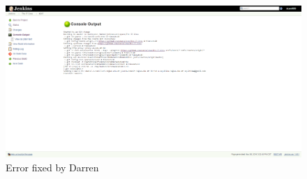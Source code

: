 \documentclass[UTF8]{article}
\begin{document}
\newpage
\begin{figure}[h]
  \includegraphics[width=\textwidth, height=\textheight,keepaspectratio]{BreakFix3Darren.PNG}
  \caption{Error fixed by Darren}
\end{figure}

\newpage
\end{document}
